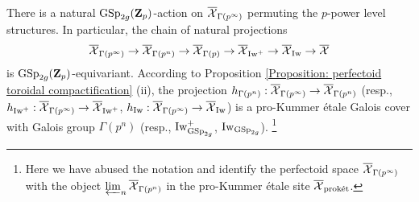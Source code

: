 There is a natural $\operatorname{GSp}_{2g}(\operatorname{\mathbf{Z}}_p)$-action on $\overline{\operatorname{\mathcal{X}}}_{\Gamma(p^{\infty})}$ permuting the $p$-power level structures. In particular, the chain of natural projections
$$\overline{\operatorname{\mathcal{X}}}_{\Gamma(p^{\infty})}\rightarrow \overline{\operatorname{\mathcal{X}}}_{\Gamma(p^n)}\rightarrow \overline{\operatorname{\mathcal{X}}}_{\Gamma(p)}\rightarrow \overline{\operatorname{\mathcal{X}}}_{\operatorname{Iw}^+}\rightarrow \overline{\operatorname{\mathcal{X}}}_{\operatorname{Iw}}\rightarrow  \overline{\operatorname{\mathcal{X}}}$$
is $\operatorname{GSp}_{2g}(\operatorname{\mathbf{Z}}_p)$-equivariant. According to Proposition \ref{Proposition: perfectoid toroidal compactification} (ii), the projection $h_{\Gamma(p^n)}:\overline{\operatorname{\mathcal{X}}}_{\Gamma(p^{\infty})}\rightarrow \overline{\operatorname{\mathcal{X}}}_{\Gamma(p^n)}$ (resp., $h_{\operatorname{Iw}^+}:\overline{\operatorname{\mathcal{X}}}_{\Gamma(p^{\infty})}\rightarrow \overline{\operatorname{\mathcal{X}}}_{\operatorname{Iw}^+}$, $h_{\operatorname{Iw}}:\overline{\operatorname{\mathcal{X}}}_{\Gamma(p^{\infty})}\rightarrow \overline{\operatorname{\mathcal{X}}}_{\operatorname{Iw}}$) is a pro-Kummer \'{e}tale Galois cover with Galois group $\Gamma(p^n)$ (resp., $\operatorname{Iw}^+_{\operatorname{GSp}_{2g}}$, $\operatorname{Iw}_{\operatorname{GSp}_{2g}}$). \footnote{Here we have abused the notation and identify the perfectoid space $\overline{\operatorname{\mathcal{X}}}_{\Gamma(p^{\infty})}$ with the object $\varprojlim_n \overline{\operatorname{\mathcal{X}}}_{\Gamma(p^n)}$ in the pro-Kummer \'{e}tale site $\overline{\operatorname{\mathcal{X}}}_{\operatorname{\textrm{prok\'{e}t}}}$.}

